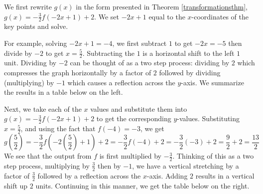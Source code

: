 \documentclass{ximera}
\begin{document}
\begin{example}
\smallskip

We first rewrite $g(x)$ in the form presented in Theorem \ref{transformationsthm}, $g(x) = -\frac{3}{2}f(-2x+1) +2$.  We set $-2x+1$ equal to the $x$-coordinates of the key points and solve. 

\smallskip

 For example, solving $-2x+1 = -4$, we first subtract $1$ to get $-2x = -5$ then divide by $-2$ to get $x = \frac{5}{2}$. Subtracting the $1$ is a horizontal shift to the left $1$ unit.  Dividing by $-2$ can be thought of as a two step process:  dividing by $2$ which compresses the graph horizontally by a factor of $2$ followed by dividing (multiplying) by $-1$ which causes a reflection across the $y$-axis.  We summarize the results in a table below on the left.
 
 \smallskip

Next, we take each of the $x$ values and substitute them into $g(x) = -\frac{3}{2}f(-2x+1) +2$ to get the corresponding $y$-values.  Substituting  $x=\frac{5}{2}$, and using the fact that $f(-4)=-3$, we get \[g\left(\frac{5}{2}\right) = -\frac{3}{2}f\left(-2\left(\frac{5}{2}\right) +1\right) +2 = -\frac{3}{2} f(-4) + 2 = -\frac{3}{2}(-3) + 2 = \frac{9}{2} + 2 = \frac{13}{2}\]  We see that the output from $f$ is first multiplied by $-\frac{3}{2}$.  Thinking of this as a two step process, multiplying by $\frac{3}{2}$ then by $-1$, we have a vertical stretching by a factor of $\frac{3}{2}$ followed by a reflection across the $x$-axis.  Adding $2$ results in a vertical shift up $2$ units.  Continuing in this manner, we get the table below on the right.

\begin{center}

\end{center}
\end{example}
\end{document}
